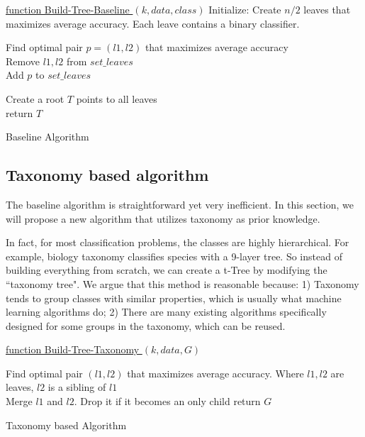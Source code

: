 \documentclass{article}
\begin{document}
\begin{algorithm}[H]\label{ag:baseline}

    \underline{function Build-Tree-Baseline $(k, data, class)$}\;
    Initialize: Create $n/2$ leaves that maximizes average accuracy. Each leave contains a binary classifier.
    
      {
        Find optimal pair $p = (l1,l2)$ that maximizes average accuracy\\
        Remove $l1,l2$ from $set\_leaves$\\
        Add $p$ to $set\_leaves$
      }
    
    Create a root $T$ points to all leaves\\
    return $T$\;
    \caption{Baseline Algorithm}
\end{algorithm}

\subsection{Taxonomy based algorithm}
The baseline algorithm is straightforward yet very inefficient. In this section, we will propose a new algorithm that utilizes taxonomy as prior knowledge. 

In fact, for most classification problems, the classes are highly hierarchical. For example, biology taxonomy classifies species with a 9-layer tree. So instead of building everything from scratch, we can create a t-Tree by modifying the ``taxonomy tree". We argue that this method is reasonable because: 1) Taxonomy tends to group classes with similar properties, which is usually what machine learning algorithms do; 2) There are many existing algorithms specifically designed for some groups in the taxonomy, which can be reused.

\begin{algorithm}[H]\label{ag:taxonomy}

    \underline{function Build-Tree-Taxonomy $(k, data, G)$}\;
    
      {
        Find optimal pair $(l1,l2)$ that maximizes average accuracy. Where $l1,l2$ are leaves, $l2$ is a sibling of $l1$\\
        Merge $l1$ and $l2$. Drop it if it becomes an only child
      }
    return $G$
    \caption{Taxonomy based Algorithm}
\end{algorithm}
\end{document}

